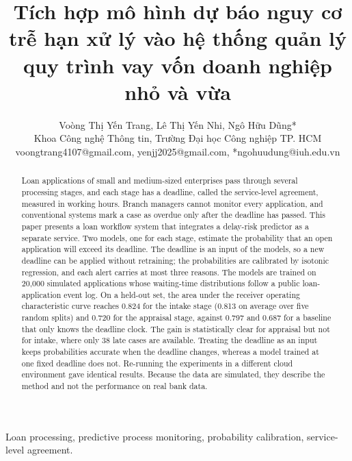 \documentclass[journal]{IEEEtran}
\begin{document}
\title{Tích hợp mô hình dự báo nguy cơ trễ hạn xử lý vào hệ thống quản lý quy trình vay vốn doanh nghiệp nhỏ và vừa}

\author{Voòng Thị Yến Trang, Lê Thị Yến Nhi, Ngô Hữu Dũng*\\
Khoa Công nghệ Thông tin, Trường Đại học Công nghiệp TP. HCM\\
voongtrang4107@gmail.com, yenjj2025@gmail.com, *ngohuudung@iuh.edu.vn}

\maketitle

{\renewcommand{\abstractname}{Abstract}
\begin{abstract}
Loan applications of small and medium-sized enterprises pass through several processing stages, and each stage has a deadline, called the service-level agreement, measured in working hours. Branch managers cannot monitor every application, and conventional systems mark a case as overdue only after the deadline has passed. This paper presents a loan workflow system that integrates a delay-risk predictor as a separate service. Two models, one for each stage, estimate the probability that an open application will exceed its deadline. The deadline is an input of the models, so a new deadline can be applied without retraining; the probabilities are calibrated by isotonic regression, and each alert carries at most three reasons. The models are trained on 20,000 simulated applications whose waiting-time distributions follow a public loan-application event log. On a held-out set, the area under the receiver operating characteristic curve reaches 0.824 for the intake stage (0.813 on average over five random splits) and 0.720 for the appraisal stage, against 0.797 and 0.687 for a baseline that only knows the deadline clock. The gain is statistically clear for appraisal but not for intake, where only 38 late cases are available. Treating the deadline as an input keeps probabilities accurate when the deadline changes, whereas a model trained at one fixed deadline does not. Re-running the experiments in a different cloud environment gave identical results. Because the data are simulated, they describe the method and not the performance on real bank data.
\end{abstract}

\begin{IEEEkeywords}
Loan processing, predictive process monitoring, probability calibration, service-level agreement.
\end{IEEEkeywords}}
\end{document}

